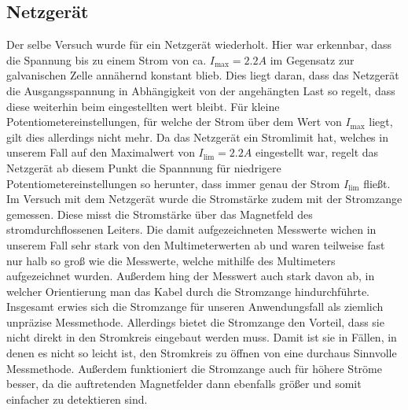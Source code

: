 \documentclass{report}
\begin{document}
\subsection{Netzgerät}
Der selbe Versuch wurde für ein Netzgerät wiederholt. Hier war erkennbar, dass die Spannung bis zu einem Strom von ca. $I_{\mathrm{max}} = 2.2 \si{A}$ im Gegensatz zur galvanischen
Zelle annähernd konstant blieb.
Dies liegt daran, dass das Netzgerät die Ausgangsspannung in Abhängigkeit von der angehängten Last so regelt, dass diese weiterhin beim eingestellten wert bleibt. Für kleine Potentiometereinstellungen, für welche 
der Strom über dem Wert von $I_{\mathrm{max}}$ liegt, gilt dies allerdings nicht mehr. Da das Netzgerät ein Stromlimit hat, welches in unserem Fall auf den Maximalwert von $I_{\mathrm{lim}} = 2.2 \si{A}$ eingestellt 
war, regelt das Netzgerät ab diesem Punkt die Spannnung für niedrigere Potentiometereinstellungen so herunter, dass immer genau der Strom $I_{\mathrm{lim}}$ fließt. 
Im Versuch mit dem Netzgerät wurde die Stromstärke zudem mit der Stromzange gemessen. Diese misst die Stromstärke über das Magnetfeld des stromdurchflossenen Leiters.
Die damit aufgezeichneten Messwerte wichen in unserem Fall sehr stark von den Multimeterwerten ab und waren teilweise fast nur halb so groß wie die Messwerte, welche mithilfe des 
Multimeters aufgezeichnet wurden. Außerdem hing der Messwert auch stark davon ab, in welcher Orientierung man das Kabel durch die Stromzange hindurchführte. Insgesamt 
erwies sich die Stromzange für unseren Anwendungsfall als ziemlich unpräzise Messmethode. Allerdings bietet die Stromzange den Vorteil, dass sie nicht direkt 
in den Stromkreis eingebaut werden muss. Damit ist sie in Fällen, in denen es nicht so leicht ist, den Stromkreis zu öffnen von eine durchaus Sinnvolle Messmethode.
Außerdem funktioniert die Stromzange auch für höhere Ströme besser, da die auftretenden Magnetfelder dann ebenfalls größer und somit einfacher zu detektieren sind.
\newpage
\end{document}
